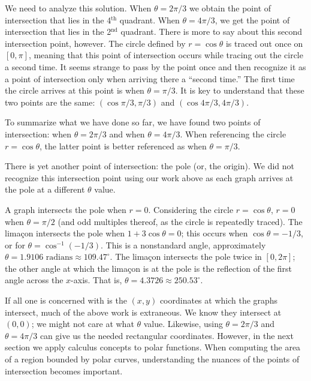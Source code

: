 {We need to analyze this solution. When $\theta = 2\pi/3$ we obtain the point of intersection that lies in the 4$^\text{th}$ quadrant. When $\theta = 4\pi/3$, we get the point of intersection that lies in the 2$^\text{nd}$ quadrant. There is more to say about this second intersection point, however. The circle defined by $r=\cos\theta$ is traced out once on $[0,\pi]$, meaning that this point of intersection occurs while tracing out the circle a second time. It seems strange to pass by the point once and then recognize it as a point of intersection only when arriving there a ``second time.'' The first time the circle arrives at this point is when $\theta = \pi/3$.
It is key to understand that these two points are the same: $(\cos \pi/3,\pi/3)$ and $(\cos 4\pi/3,4\pi/3)$. 

To summarize what we have done so far, we have found two points of intersection: when $\theta=2\pi/3$ and when $\theta=4\pi/3$. When referencing the circle $r=\cos \theta$, the latter point is better referenced as when $\theta=\pi/3$.

There is yet another point of intersection: the pole (or, the origin). We did not recognize this intersection point using our work above as each graph arrives at the pole at a different $\theta$ value.

A graph intersects the pole when $r=0$. Considering the circle $r=\cos\theta$, $r=0$ when $\theta = \pi/2$ (and odd multiples thereof, as the circle is repeatedly traced). The lima\c con intersects the pole when $1+3\cos\theta =0$; this occurs when $\cos \theta = -1/3$, or for $\theta = \cos^{-1}(-1/3)$. This is a nonstandard angle, approximately $\theta = 1.9106\text{ radians} \approx 109.47^\circ$. The lima\c con intersects the pole twice in $[0,2\pi]$; the other angle at which the lima\c con is at the pole is the reflection of the first angle across the $x$-axis. That is, $\theta = 4.3726 \approx 250.53^\circ.$}

If all one is concerned with is the $(x,y)$ coordinates at which the graphs intersect, much of the above work is extraneous. We know they intersect at $(0,0)$; we might not care at what $\theta$ value. Likewise, using $\theta =2\pi/3$ and $\theta=4\pi/3$ can give us the needed rectangular coordinates. However, in the next section we apply calculus concepts to polar functions. When computing the area of a region bounded by polar curves, understanding the nuances of the points of intersection becomes important.

